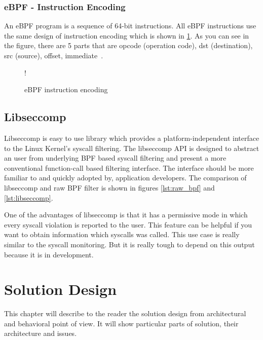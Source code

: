 \subsection{eBPF - Instruction Encoding}
An eBPF program is a sequence of 64-bit instructions.
All eBPF instructions use the same design of instruction encoding which is shown in \ref{fig:tikz:eBPF_instruction}.
As you can see in the figure, there are 5 parts that are opcode (operation code), dst (destination), src (source), offset, immediate~\cite{kernel_bpf_specification}.

\begin{figure}[h]
  \centering
  \resizebox {\textwidth} {!} {
    
  }
  \caption{eBPF instruction encoding}
  \label{fig:tikz:eBPF_instruction}
\end{figure}

\section{Libseccomp}
Libseccomp\cite{libseccomp_git} is easy to use library which provides a platform-independent interface to the Linux Kernel's syscall filtering.
The libseccomp API is designed to abstract an user from underlying BPF based syscall filtering and present a more conventional function-call based filtering interface.
The interface should be more familiar to and quickly adopted by, application developers.
The comparison of libseccomp and raw BPF filter is shown in figures \ref{lst:raw_bpf} and \ref{lst:libseccomp}.

One of the advantages of libseccomp is that it has a permissive mode in which every syscall violation is reported to the user.
This feature can be helpful if you want to obtain information which syscalls was called.
This use case is really similar to the syscall monitoring.
But it is really tough to depend on this output because it is in development.


\chapter{Solution Design}
\label{chap:design}
This chapter will describe to the reader the solution design from architectural and behavioral point of view.
It will show particular parts of solution, their architecture and issues.

